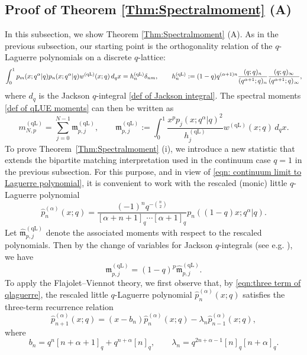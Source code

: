 \documentclass{amsart}
\def\wh{\widehat}
\theoremstyle{plain}
\theoremstyle{remark}
\numberwithin{equation}{section}
\begin{document}
\subsection{Proof of Theorem \ref{Thm:Spectralmoment} (A)} \label{Subsection_Them moment A}

In this subsection, we show Theorem \ref{Thm:Spectralmoment} (A). As in the previous subsection, our starting point is the orthogonality relation of the $q$-Laguerre polynomials on a discrete $q$-lattice: 
\begin{equation}\label{eqn:orthogonality of little q Laguerre}
    \int_{0}^{1}p_{m}(x;q^{\alpha}|q)p_{n}(x;q^{\alpha}|q)w^{(\mathrm{qL})}(x;q)\,d_{q}x
    =h_{n}^{(\mathrm{qL})}\delta_{nm}, \qquad h_n^{ \rm (qL) }:=(1-q)q^{(\alpha+1)n}\frac{(q;q)_{n}}{(q^{\alpha+1};q)_{n}}\frac{(q;q)_{\infty}}{(q^{\alpha+1};q)_{\infty}},
\end{equation}
where $d_q$ is the Jackson $q$-integral \eqref{def of Jackson integral}. 
The spectral moments \eqref{def of qLUE moments} can then be written as 
\begin{equation}
  m_{N,p}^{(\mathrm{qL})}=\sum_{j=0}^{N-1}\mathfrak{m}_{p,j}^{(\mathrm{qL})}, \qquad    \mathfrak{m}_{p,j}^{(\mathrm{qL})}:=\int_{0}^{1}\frac{x^{p}p_{j}(x;q^{\alpha}|q)^{2}}{h_{j}^{(\mathrm{qL})}}w^{(\mathrm{qL})}(x;q)\,d_{q}x. 
\end{equation} 
To prove Theorem~\ref{Thm:Spectralmoment} (i), we introduce a new statistic that extends the bipartite matching interpretation used in the continuum case $q=1$ in the previous subsection. For this purpose, and in view of \eqref{eqn: continuum limit to Laguerre polynomial}, it is convenient to work with the rescaled (monic) little $q$-Laguerre polynomial
\begin{equation}
    \wh{p}_{n}^{(\alpha)}(x;q)
    =\frac{(-1)^{n}q^{-\binom{n}{2}}}{[\alpha+n+1]_{q}\cdots [\alpha+1]_{q}}p_n((1-q)x;q^{\alpha} \vert q).
\end{equation}
Let $\widehat{\mathfrak{m}}_{p,j}^{(\mathrm{qL})}$ denote the associated moments with respect to the rescaled polynomials. Then by the change of variables for Jackson $q$-integrals (see e.g. \cite[Eq. (1.38)]{BFO24}), we have 
\begin{equation} \label{m hat m relation}
\mathfrak{m}_{p,j}^{(\mathrm{qL})}=(1-q)^{p} \wh{\mathfrak{m}}_{p,j}^{(\mathrm{qL})}.
\end{equation}
To apply the Flajolet--Viennot theory, we first observe that, by \eqref{eqn:three term of qlaguerre}, the rescaled little $q$-Laguerre polynomial $\widehat{p}_{n}^{(\alpha)}(x;q)$ satisfies the three-term recurrence relation
\begin{equation} \label{three term for p hat}
    \widehat{p}_{n+1}^{(\alpha)}(x;q)= (x-b_n)\widehat{p}_{n}^{(\alpha)}(x;q) -\lambda_n \widehat{p}_{n-1}^{(\alpha)}(x;q),  
\end{equation}
where 
\begin{equation} \label{bn lambdan for q Laguerre}
b_n=q^{n}[n+\alpha+1]_{q}+q^{n+\alpha}[n]_{q}, \qquad \lambda_n= q^{2n+\alpha-1}[n]_{q}[n+\alpha]_{q}. 
\end{equation}
 
\end{document}
